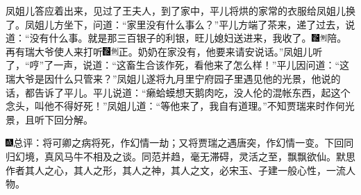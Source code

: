 凤姐儿答应着出来，见过了王夫人，到了家中，平儿将烘的家常的衣服给凤姐儿换了。凤姐儿方坐下，问道：``家里没有什么事么？''平儿方端了茶来，递了过去，说道：``没有什么事。就是那三百银子的利银，旺儿媳妇送进来，我收了。{\includegraphics[width=3mm]{../Images/00006}\includegraphics[width=3mm]{../Images/00011}\footnotesize \kaishu 陪。}再有瑞大爷使人来打听{\includegraphics[width=3mm]{../Images/00006}\includegraphics[width=3mm]{../Images/00011}\footnotesize \kaishu 正。}奶奶在家没有，他要来请安说话。''凤姐儿听了，``哼''了一声，说道：``这畜生合该作死，看他来了怎么样！''平儿因问道：``这瑞大爷是因什么只管来？''凤姐儿遂将九月里宁府园子里遇见他的光景，他说的话，都告诉了平儿。平儿说道：``癞蛤蟆想天鹅肉吃，没人伦的混帐东西，起这个念头，叫他不得好死！''凤姐儿道：``等他来了，我自有道理。''不知贾瑞来时作何光景，且听下回分解。

{\includegraphics[width=3mm]{../Images/00005}总评：将可卿之病将死，作幻情一劫；又将贾瑞之遇唐突，作幻情一变。下回同归幻境，真风马牛不相及之谈。同范并趋，毫无滞碍，灵活之至，飘飘欲仙。默思作者其人之心，其人之形，其人之神，其人之文，必宋玉、子建一般心性，一流人物。}
